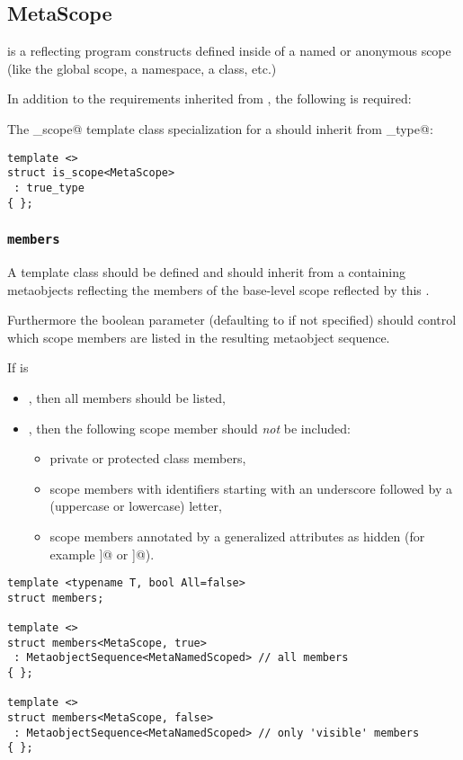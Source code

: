 \subsection{MetaScope}
\label{concept-MetaScope}

 is a  reflecting program constructs defined inside
of a named or anonymous scope (like the global scope, a namespace, a class, etc.)

In addition to the requirements inherited from , the following is required:

The \verb@is_scope@ template class specialization for a  should
inherit from \verb@true_type@:

\begin{verbatim}
template <>
struct is_scope<MetaScope>
 : true_type
{ };
\end{verbatim}

\subsubsection{\texttt{members}}

A template class \verb@members@ should be defined and should inherit from a
 containing  metaobjects reflecting
the members of the base-level scope reflected by this .

Furthermore the boolean \verb@All@ parameter (defaulting to \verb@false@ if not specified)
should control which scope members are listed in the resulting metaobject sequence.

If \verb@All@ is 
\begin{itemize}
\item \verb@true@, then all members should be listed,
\item \verb@false@, then the following scope member should {\em not} be included:
	\begin{itemize}
	\item private or protected class members,
	\item scope members with identifiers starting with an underscore followed by a
	(uppercase or lowercase) letter,
	\item scope members annotated by a generalized attributes as hidden (for example
	\verb@[[mirror::hidden]]@ or \verb@[[reflection::hidden]]@).
	\end{itemize}
\end{itemize}



\begin{verbatim}
template <typename T, bool All=false>
struct members;

template <>
struct members<MetaScope, true>
 : MetaobjectSequence<MetaNamedScoped> // all members
{ };

template <>
struct members<MetaScope, false>
 : MetaobjectSequence<MetaNamedScoped> // only 'visible' members
{ };
\end{verbatim}

